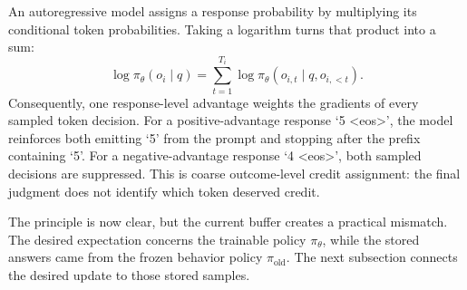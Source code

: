 An autoregressive model assigns a response probability by multiplying its conditional
token probabilities. Taking a logarithm turns that product into a sum:
\begin{equation}
  \log\pi_\theta(o_i\mid q)
  =\sum_{t=1}^{T_i}\log\pi_\theta(o_{i,t}\mid q,o_{i,<t}).
  \label{eq:grpo-response-logprob-decomposition}
\end{equation}
Consequently, one response-level advantage weights the gradients of every sampled token
decision. For a positive-advantage response `5 <eos>', the model reinforces both emitting
`5' from the prompt and stopping after the prefix containing `5'. For a
negative-advantage response `4 <eos>', both sampled decisions are suppressed. This is
coarse outcome-level credit assignment: the final judgment does not identify which token
deserved credit.

The principle is now clear, but the current buffer creates a practical mismatch. The
desired expectation concerns the trainable policy $\pi_\theta$, while the stored answers
came from the frozen behavior policy $\pi_{\mathrm{old}}$. The next subsection connects
the desired update to those stored samples.
